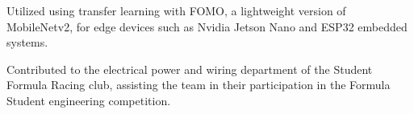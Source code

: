 \documentclass[10pt,letterpaper,ragged2e,withhyper]{altacv}
\begin{document}
\begin{paracol}{2}
\divider

Utilized using transfer learning with FOMO, a lightweight version of \newline MobileNetv2, for edge devices such as Nvidia Jetson Nano and ESP32 embedded systems.

\divider

Contributed to the electrical power and wiring department of the \newline Student Formula Racing club, assisting the team in their participation in the Formula Student engineering competition.

















\end{paracol}
\end{document}
